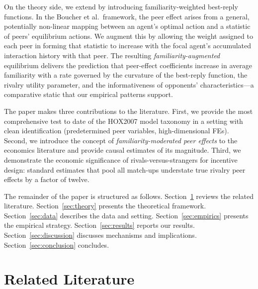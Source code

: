 \documentclass[12pt]{article}
\theoremstyle{definition}
\theoremstyle{remark}
\begin{document}
On the theory side, we extend \citet{Boucher2024} by introducing
familiarity-weighted best-reply functions.
In the Boucher et al.\ framework, the peer effect arises from a general,
potentially non-linear mapping between an agent's optimal action and a statistic
of peers' equilibrium actions.
We augment this by allowing the weight assigned to each peer in forming that
statistic to increase with the focal agent's accumulated interaction history with
that peer.
The resulting \textit{familiarity-augmented} equilibrium delivers the prediction that
peer-effect coefficients increase in average familiarity with a rate governed by
the curvature of the best-reply function, the rivalry utility parameter, and the
informativeness of opponents' characteristics---a comparative static that our
empirical patterns support.

The paper makes three contributions to the literature.
First, we provide the most comprehensive test to date of the HOX2007 model
taxonomy in a setting with clean identification (predetermined peer variables,
high-dimensional FEs).
Second, we introduce the concept of \textit{familiarity-moderated peer effects}
to the economics literature and provide causal estimates of its magnitude.
Third, we demonstrate the economic significance of rivals-versus-strangers for
incentive design: standard estimates that pool all match-ups understate true
rivalry peer effects by a factor of twelve.

The remainder of the paper is structured as follows.
Section~\ref{sec:literature} reviews the related literature.
Section~\ref{sec:theory} presents the theoretical framework.
Section~\ref{sec:data} describes the data and setting.
Section~\ref{sec:empirics} presents the empirical strategy.
Section~\ref{sec:results} reports our results.
Section~\ref{sec:discussion} discusses mechanisms and implications.
Section~\ref{sec:conclusion} concludes.

\section{Related Literature}
\label{sec:literature}
\end{document}
